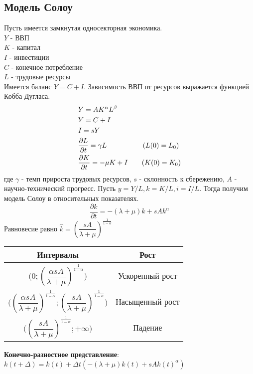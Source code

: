 \subsection{Модель Солоу}
Пусть имеется замкнутая односекторная экономика.\\
$Y$ - ВВП\\
$K$ - капитал\\
$I$ - инвестиции\\
$C$ - конечное потребление\\
$L$ - трудовые ресурсы\\
Имеется баланс $Y=C+I$. Зависимость ВВП от ресурсов выражается функцией Кобба-Дугласа.
\begin{align}
  &Y=AK^{\alpha}L^{\beta}\notag\\
  &Y=C+I\notag\\
  &I=sY\\
  &\dfrac{\partial L}{\partial t}=\gamma L \qquad \qquad\quad\,(L(0)=L_0)\notag\\
  &\dfrac{\partial K}{\partial t}=-\mu K+I \qquad(K(0)=K_0)\notag
\end{align}
где $ \gamma$ - темп прироста трудовых ресурсов, $s$ - склонность к сбережению, $A$ - научно-технический прогресс.
Пусть $y=Y/L,k=K/L,i=I/L$. Тогда получим модель Солоу в относительных показателях.
\begin{equation}
  \frac{\partial k}{\partial t}=-(\lambda+\mu)k+sAk^{\alpha}
\end{equation}
Равновесие равно $\hat{k}=(\dfrac{sA}{\lambda+\mu})^{\frac{1}{1-\alpha}}$
\begin{center}
\begin{tabular}{|c|c|}
  \hline
  Интервалы&Рост\\
  \hline
  $\bigg(0;(\dfrac{\alpha sA}{\lambda+\mu})^{\frac{1}{1-\alpha}}\bigg)$&Ускоренный рост\\
  \hline
  $\bigg((\dfrac{\alpha sA}{\lambda+\mu})^{\frac{1}{1-\alpha}};(\dfrac{sA}{\lambda+\mu})^{\frac{1}{1-\alpha}}\bigg)$&Насыщенный рост\\
  \hline
  $\bigg((\dfrac{sA}{\lambda+\mu})^{\frac{1}{1-\alpha}};+\infty\bigg)$&Падение\\
  \hline
\end{tabular}
\end{center}
\textbf{Конечно-разностное представление}:
$k(t+\Delta)=k(t)+\Delta t(-(\lambda+\mu)k(t)+sAk(t)^{\alpha})$

